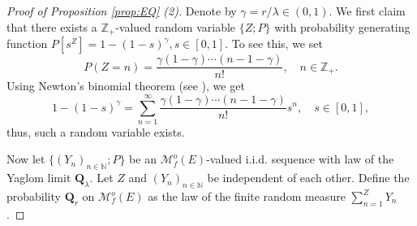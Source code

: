 \documentclass[12pt,a4paper]{amsart}
\numberwithin{equation}{section}
\theoremstyle{plain}
\theoremstyle{definition}
\theoremstyle{remark}
\begin{document}
\begin{proof}[Proof of Proposition \ref{prop:EQ} (2)]
	Denote by $\gamma = r / \lambda \in (0,1)$.
	We first claim that there exists a $\mathbb Z_+$-valued random variable $\{Z;P\}$ with probability generating function $P[s^Z] = 1 - (1- s)^{\gamma}, s\in [0,1]$.
	To see this, we set
\[
	P(Z = n) = \frac{\gamma(1-\gamma ) \cdots (n-1-\gamma  )}{n!},
	\quad n \in \mathbb Z_+.
\]
	Using Newton's binomial theorem (see \cite[Exercise 8.22]{Rudin1976Principles}), we get
\[
	1 - (1 - s)^\gamma
	= \sum_{n = 1}^\infty \frac{\gamma (1-\gamma)\cdots (n-1-\gamma )}{n!} s^n,
	\quad s\in [0,1],
\]
	thus, such a random variable exists.
	
	Now let $\{(Y_n)_{n \in \mathbb N}; P\}$
	be an $\mathcal M^o_f(E)$-valued i.i.d. sequence
	with law of the Yaglom limit $\mathbf Q_\lambda$.
	Let $Z$ and $(Y_n)_{n\in \mathbb N}$ be independent of each other.
	Define the probability $\mathbf Q_r$ on $\mathcal M^o_f(E)$ as the law of the finite random measure $\sum_{n=1}^Z Y_n$.
	

\end{proof}
\end{document}
